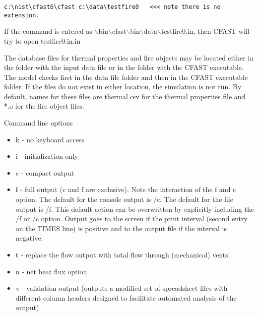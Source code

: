\begin{lstlisting}
c:\nist\cfast6\cfast c:\data\testfire0   <<< note there is no extension.
\end{lstlisting}

If the command is entered as $\backslash$bin$\backslash$cfast$\backslash$bin$\backslash$data$\backslash$testfire0.in, then CFAST will try to open testfire0.in.in

The database files for thermal properties and fire objects may be located either in the folder with the input data file or in the folder with the CFAST executable. The model checks first in the data file folder and then in the CFAST executable folder.  If the files do not exist in either location, the simulation is not run. By default, names for these files are thermal.csv for the thermal properties file and *.o for the fire object files.

Command line options

\begin{itemize}
\item k - no keyboard access
\item i - initialization only
\item c - compact output
\item f - full output (c and f are exclusive). Note the interaction of the f and c option. The default for the console output is /c. The default for the file output is /f. This default action can be overwritten by explicitly including the /f or /c option. Output goes to the screen if the print interval (second entry on the TIMES line) is positive and to the output file if the interval is negative.
\item t - replace the flow output with total flow through (mechanical) vents.
\item n - net heat flux option
\item v - validation output (outputs a modified set of spreadsheet files with different column headers designed to facilitate automated analysis of the output)
\end{itemize}

